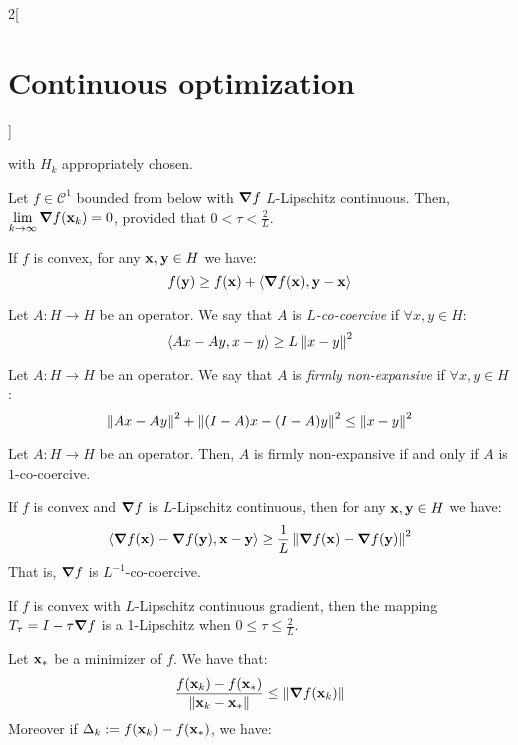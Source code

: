 \documentclass[../../../main_math.tex]{subfiles}
\begin{document}
\begin{multicols}{2}[\section{Continuous optimization}]
\begin{definition}
\begin{itemize}
\begin{itemize}
$$                    $$
                    with $H_k$ appropriately chosen.
            \end{itemize}
    \end{itemize}
  \end{definition}
  \begin{proposition}
    Let $f\in\mathcal{C}^1$ bounded from below with $\grad f$ $L$-Lipschitz continuous. Then, $\displaystyle\lim_{k\rightarrow\infty} \grad f(\boldsymbol{\mathrm{x}}_k)=0$, provided that $0<\tau<\frac{2}{L}$.
  \end{proposition}
  \begin{proposition}
    If $f$ is convex, for any $\boldsymbol{\mathrm{x}},\boldsymbol{\mathrm{y}}\in H$ we have:
    $$
      f(\boldsymbol{\mathrm{y}})\geq f(\boldsymbol{\mathrm{x}})+\langle \grad f(\boldsymbol{\mathrm{x}}),\boldsymbol{\mathrm{y}}-\boldsymbol{\mathrm{x}}\rangle
    $$
  \end{proposition}
  \begin{definition}
    Let $A:H\to H$ be an operator. We say that $A$ is \emph{$L$-co-coercive} if $\forall x,y\in H$:
    $$
      \langle Ax-Ay,x-y\rangle\geq L \left\|x-y\right\|^2
    $$
  \end{definition}
  \begin{definition}
    Let $A:H\to H$ be an operator. We say that $A$ is \emph{firmly non-expansive} if $\forall x,y\in H$:
    $$
      \left\|Ax-Ay\right\|^2+\left\|(I-A)x-(I-A)y\right\|^2\leq \left\|x-y\right\|^2
    $$
  \end{definition}
  \begin{lemma}
    Let $A:H\to H$ be an operator. Then, $A$ is firmly non-expansive if and only if $A$ is $1$-co-coercive.
  \end{lemma}
  \begin{theorem}
    If $f$ is convex and $\grad f$ is $L$-Lipschitz continuous, then for any $\boldsymbol{\mathrm{x}},\boldsymbol{\mathrm{y}}\in H$ we have:
    $$
      \langle \grad f(\boldsymbol{\mathrm{x}})-\grad f(\boldsymbol{\mathrm{y}}),\boldsymbol{\mathrm{x}}-\boldsymbol{\mathrm{y}}\rangle\geq \frac{1}{L} \left\|\grad f(\boldsymbol{\mathrm{x}})-\grad f(\boldsymbol{\mathrm{y}})\right\|^2
    $$
    That is, $\grad f$ is $L^{-1}$-co-coercive.
  \end{theorem}
  \begin{lemma}
    If $f$ is convex with $L$-Lipschitz continuous gradient, then the mapping $T_\tau=I-\tau \grad f$ is a 1-Lipschitz when $0\leq \tau\leq \frac{2}{L}$.
  \end{lemma}
  \begin{proposition}
    Let $\boldsymbol{\mathrm{x}}_*$ be a minimizer of $f$. We have that:
    $$
      \frac{f(\boldsymbol{\mathrm{x}}_k)-f(\boldsymbol{\mathrm{x}}_*)}{\left\|\boldsymbol{\mathrm{x}}_k-\boldsymbol{\mathrm{x}}_*\right\|}\leq \left\|\grad f(\boldsymbol{\mathrm{x}}_k)\right\|
    $$
    Moreover if $\Delta_k:=f(\boldsymbol{\mathrm{x}}_k)-f(\boldsymbol{\mathrm{x}}_*)$, we have:

\end{proposition}
\end{multicols}
\end{document}
